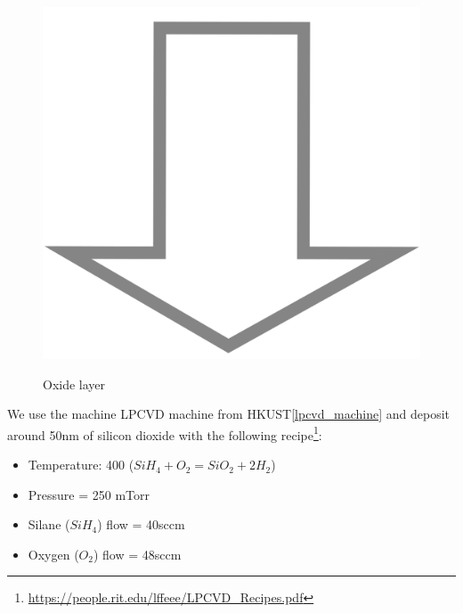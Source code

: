 \begin{figure}[H]
	\centering
	\begin{tikzpicture}[node distance = 3cm, auto, thick,scale=\CrossSectionOnly, every node/.style={transform shape}]
		
	\end{tikzpicture}\\
	\includegraphics[scale=0.01]{down_arrow.png}\\
	\begin{tikzpicture}[node distance = 3cm, auto, thick,scale=\CrossSectionOnly, every node/.style={transform shape}]
		
	\end{tikzpicture}
	\caption{Oxide layer}
\end{figure}

We use the machine LPCVD machine from HKUST\autoref{lpcvd_machine} and deposit around 50nm of silicon dioxide with the following recipe\footnote{\url{https://people.rit.edu/lffeee/LPCVD_Recipes.pdf}}:
\begin{itemize}
	\item Temperature: 400 \degreesC  ($Si H_4 + O_2 = Si O_2 + 2 H_2$)
	\item Pressure = 250 mTorr
	\item Silane ($Si H_4$) flow = 40sccm
	\item Oxygen ($O_2$) flow = 48sccm
\end{itemize}

